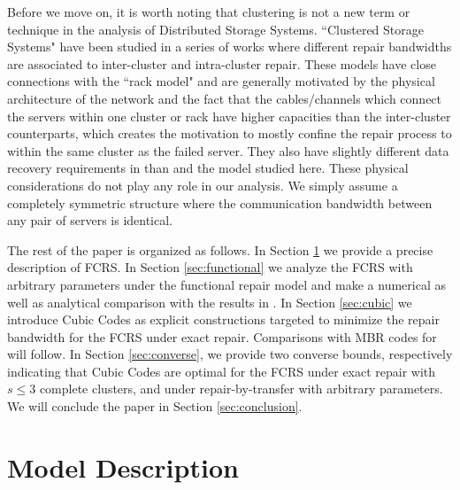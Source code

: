 \documentclass[journal,onecolumn,draftcls]{IEEEtran}
\begin{document}
Before we move on, it is worth noting that clustering is not a new term or technique in the analysis of Distributed Storage Systems. ``Clustered Storage Systems" have been studied in a series of works \cite{prakash2016generalization,prakash2017storage} where different repair bandwidths are associated to inter-cluster and intra-cluster repair. These models have close connections with the ``rack model" \cite{gaston2013realistic,pernas2013non,tebbi2014code} and are generally motivated by the physical architecture of the network and the fact that the cables/channels which connect the servers within one cluster or rack have higher capacities than the inter-cluster counterparts, which creates the motivation to mostly confine the repair process to within the same cluster as the failed server. They also have slightly different data recovery requirements in \cite{prakash2016generalization}  than \cite{dimakis2010network} and the model studied here. These physical considerations do not play any role in our analysis. We simply assume a completely symmetric structure where the communication bandwidth between any pair of servers is identical.

The rest of the paper is organized as follows. In Section \ref{sec:model} we provide a precise description of FCRS. In Section \ref{sec:functional} we analyze the FCRS with arbitrary parameters under the functional repair model and make a numerical as well as analytical comparison with the results in \cite{dimakis2010network}. In Section \ref{sec:cubic} we introduce Cubic Codes as explicit constructions targeted to minimize the repair bandwidth for the FCRS under exact repair. Comparisons with MBR codes for \cite{dimakis2010network} will follow. In Section \ref{sec:converse}, we provide two converse bounds, respectively indicating that Cubic Codes are optimal for the FCRS under exact repair with $s\le 3$ complete clusters, and under repair-by-transfer with arbitrary parameters. We will conclude the paper in Section \ref{sec:conclusion}.


\section{Model Description}
\label{sec:model}
\end{document}
